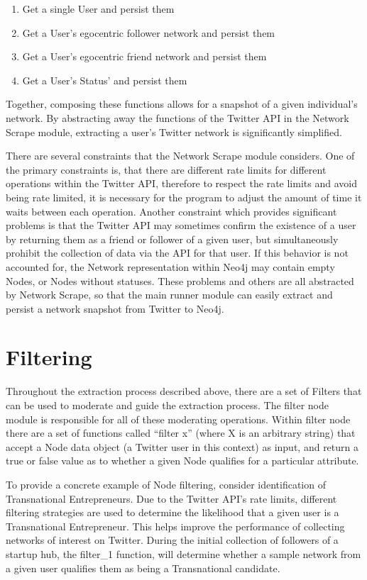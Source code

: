\begin{enumerate}
\item Get a single User and persist them
\item Get a User's egocentric follower network and persist them
\item Get a User's egocentric friend network and persist them
\item Get a User's Status' and persist them
\end{enumerate}

Together, composing these functions allows for a snapshot of a given
individual's network. By abstracting away the functions of the Twitter
API in the Network Scrape module, extracting a user's Twitter network
is significantly simplified.

There are several constraints that the Network Scrape module
considers. One of the primary constraints is, that there are different
rate limits for different operations within the Twitter API, therefore
to respect the rate limits and avoid being rate limited, it is
necessary for the program to adjust the amount of time it waits
between each operation. Another constraint which provides significant
problems is that the Twitter API may sometimes confirm the existence
of a user by returning them as a friend or follower of a given user,
but simultaneously prohibit the collection of data via the API for
that user. If this behavior is not accounted for, the Network
representation within Neo4j may contain empty Nodes, or Nodes without
statuses. These problems and others are all abstracted by Network
Scrape, so that the main runner module can easily extract and persist
a network snapshot from Twitter to Neo4j.

\section{Filtering}
Throughout the extraction process described above, there are a set of
Filters that can be used to moderate and guide the extraction process.
The filter node module is responsible for all of these moderating
operations.  Within filter node there are a set of functions called
``filter x'' (where X is an arbitrary string) that accept a Node data
object (a Twitter user in this context) as input, and return a true or
false value as to whether a given Node qualifies for a particular
attribute.

To provide a concrete example of Node filtering, consider
identification of Transnational Entrepreneurs. Due to the Twitter
API's rate limits, different filtering strategies are used to
determine the likelihood that a given user is a Transnational
Entrepreneur. This helps improve the performance of collecting networks
of interest on Twitter. During the initial collection of followers of
a startup hub, the filter\_1 function, will determine whether a sample
network from a given user qualifies them as being a Transnational
candidate.

